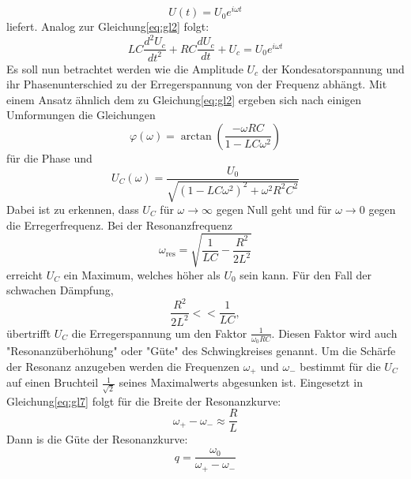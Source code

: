 \begin{equation*}
  U(t)= U_0 e^{i\omega t}
\end{equation*}
liefert.
Analog zur Gleichung\eqref{eq:gl2} folgt:
\begin{equation}
  LC\frac{d^2 U_c}{dt^2} +RC \frac{d U_c}{dt}+U_c = U_0 e^{i\omega t}
\end{equation}
Es soll nun betrachtet werden wie die Amplitude $U_c$ der Kondesatorspannung und ihr Phasenunterschied zu der Erregerspannung von der Frequenz abhängt.
Mit einem Ansatz ähnlich dem zu Gleichung\eqref{eq:gl2} ergeben sich nach einigen Umformungen die Gleichungen
\begin{equation}
  \varphi(\omega)=\arctan(\frac{-\omega RC}{1-LC\omega^2})
\end{equation}
für die Phase und
\begin{equation}
  \label{eq:gl7}
  U_C(\omega)=\frac{U_0}{\sqrt{(1-LC\omega^2)^2+\omega^2 R^2 C^2}}
\end{equation}
Dabei ist zu erkennen, dass $U_C$ für $\omega \rightarrow \infty$ gegen Null geht und für $\omega \rightarrow 0$ gegen die Erregerfrequenz.
Bei der Resonanzfrequenz
\begin{equation}
  \omega_\text{res} =\sqrt{\frac{1}{LC}-\frac{R^2}{2L^2}}
\end{equation}
erreicht $U_C$ ein Maximum, welches höher als $U_0$ sein kann.
Für den Fall der schwachen Dämpfung,
\begin{equation}
  \frac{R^2}{2L^2}<<\frac{1}{LC} ,
\end{equation}
übertrifft $U_C$ die Erregerspannung um den Faktor $\frac{1}{\omega_0 R C}$.
Diesen Faktor wird auch "Resonanzüberhöhung" oder "Güte" des Schwingkreises genannt.
Um die Schärfe der Resonanz anzugeben werden die Frequenzen $\omega_+$ und $\omega_-$ bestimmt für die $U_C$ auf einen Bruchteil $\frac{1}{\sqrt{2}}$ seines Maximalwerts abgesunken ist.
Eingesetzt in Gleichung\eqref{eq:gl7} folgt für die Breite der Resonanzkurve:
\begin{equation}
  \omega_+ - \omega_- \approx \frac{R}{L}
\end{equation}
Dann is die Güte der Resonanzkurve:
\begin{equation}
  q = \frac{\omega_0}{\omega_+ - \omega_-}
\end{equation}
